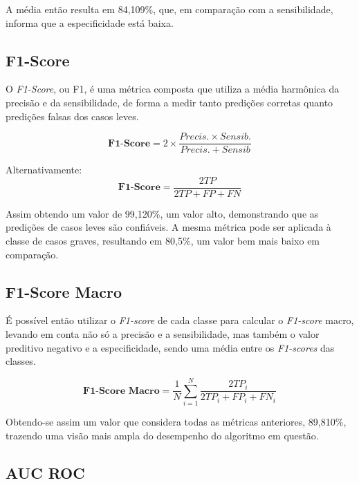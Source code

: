 A média então resulta em 84,109\%, que, em comparação com a sensibilidade, informa que a especificidade está baixa.

\subsection{F1-Score}
\label{subsec:f1-score}

O \textit{F1-Score}, ou F1, é uma métrica composta que utiliza a média harmônica da precisão e da sensibilidade, de forma a medir tanto predições corretas quanto predições falsas dos casos leves.

\begin{equation}
  \textbf{F1-Score} = 2\times\frac{Precis.\times Sensib.}{Precis. + Sensib}
\end{equation}

Alternativamente:
\begin{equation}
  \textbf{F1-Score} = \frac{2TP}{2TP + FP + FN}
\end{equation}

Assim obtendo um valor de 99,120\%, um valor alto, demonstrando que as predições de casos leves são confiáveis.
A mesma métrica pode ser aplicada à classe de casos graves, resultando em 80,5\%, um valor bem mais baixo em comparação.

\subsection{F1-Score Macro}
\label{subsec:f1-score-macro}

É possível então utilizar o \textit{F1-score} de cada classe para calcular o \textit{F1-score} macro, levando em conta não só a precisão e a sensibilidade, mas também o valor preditivo negativo e a especificidade, sendo uma média entre os \textit{F1-scores} das classes.

  \begin{equation}
    \textbf{F1-Score Macro} = \frac{1}{N}\sum_{i=1}^{N}\frac{2TP_{i}}{2TP_{i} + FP_{i} + FN_{i}}
  \end{equation}

Obtendo-se assim um valor que considera todas as métricas anteriores, 89,810\%, trazendo uma visão mais ampla do desempenho do algoritmo em questão.

\subsection{AUC ROC}
\label{subsec:curva-roc}

